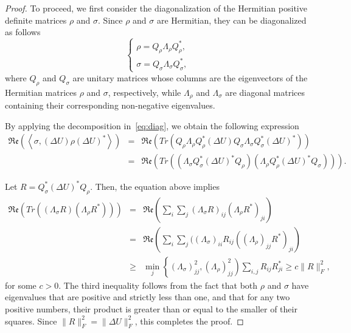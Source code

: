 \documentclass[sn-mathphys-num]{sn-jnl}%
\newcommand{\rinner}[1]{\mathfrak{Re}\left(\left<#1\right>\right)}
\theoremstyle{thmstyleone}%
\theoremstyle{thmstyletwo}%
\theoremstyle{thmstylethree}%
\begin{document}
\begin{proof}
To proceed, we first consider the diagonalization of the Hermitian positive definite matrices $\rho$ and $\sigma$. 
Since $ \rho $ and $ \sigma $ are Hermitian, they can be diagonalized as follows
\begin{equation}\label{eq:diag}
\left \{
\begin{array}{l}
\rho = Q_\rho \Lambda_\rho Q_\rho^*, \\
\sigma = Q_\sigma \Lambda_\sigma Q_\sigma^*,
            \end{array}
        \right.
    \end{equation}
where 
$Q_\rho$ and $Q_\sigma$ are unitary matrices whose columns are the eigenvectors of the Hermitian matrices $\rho$ and $\sigma$, respectively, while $ \Lambda_\rho$ and $\Lambda_\sigma$ are diagonal matrices containing their corresponding non-negative eigenvalues.

By applying the decomposition in~\eqref{eq:diag}, we obtain the following expression
\begin{eqnarray*}\label{eq:eval}
        \rinner{\sigma, \left(\Delta U\right)\rho \left(\Delta U\right)^*}
&=&\mathfrak{Re}(Tr\left( Q_\rho \Lambda_\rho Q_\rho^* (\Delta U) Q_\sigma \Lambda_\sigma Q_\sigma^* (\Delta U)^*\right)) \nonumber\\
&=& \mathfrak{Re}\left(Tr\left( (\Lambda_\sigma Q_\sigma^* (\Delta U)^* Q_\rho )(\Lambda_\rho Q_\rho^* (\Delta U)^* Q_\sigma )\right)\right).
    \end{eqnarray*}

Let $R = Q_\sigma^* (\Delta U)^* Q_\rho$. Then, the equation above implies  
    \begin{eqnarray*}
        \mathfrak{Re}\left(Tr\left( (\Lambda_\sigma R)(\Lambda_\rho R^*)\right)\right) &=& \mathfrak{Re}\left(\sum_{i}\sum_{j} (\Lambda_\sigma R)_{ij} (\Lambda_\rho R^*)_{ji}\right) \\
        &=& \mathfrak{Re}\left(\sum_{i}\sum_{j} ((\Lambda_\sigma)_{ii} R_{ij} ((\Lambda_\rho)_{jj} R^*)_{ji}\right)\\
        &\geq& \min_j\left\{(\Lambda_\sigma)_{jj}^2,(\Lambda_\rho)_{jj}^2 \right) \sum_{i, j} R_{ij}R^*_{ji} \geq c \|R\|_F^2, 
    \end{eqnarray*}
  for some $c>0$.
{
  The third inequality follows from the fact that both $ \rho $ and $ \sigma $ have eigenvalues that are positive and strictly less than one, and that for any two positive numbers, their product is greater than or equal to the smaller of their squares.
  }
Since $\|R\|_F^2 = \|\Delta U\|_F^2$, this completes the proof.
%
\end{proof}
%
\end{document}

